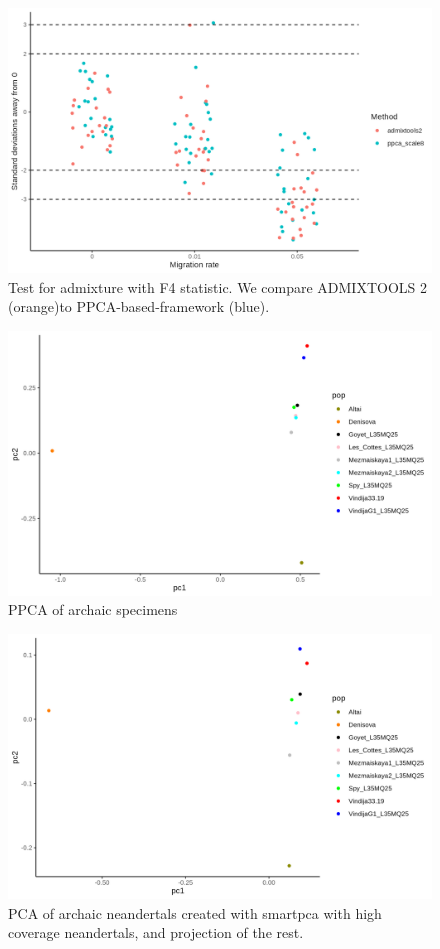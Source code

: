 \documentclass[12pt, letterpaper]{article}
\begin{document}
\begin{figure}[ht!]
    \includegraphics[width=16.5cm]{plots/simfiles/AvgFolder/Ne1000/split_times1000/npop10_nind100/missing0/plots_8/hypothesis_test_comparison.png}
    \centering
    \caption{Test for admixture with F4 statistic. We compare ADMIXTOOLS 2 (orange)to PPCA-based-framework (blue).}
    \label{figS2:pc_scale}
\end{figure}


\begin{figure}[ht!]
    \includegraphics[width=16.5cm]{plots/neandertal_pca_smartpca.png}
    \centering
    \caption{PPCA of archaic specimens}
    \label{figS2:pc_scale}
\end{figure}

\begin{figure}[ht!]
    \includegraphics[width=16.5cm]{plots/neandertal_ppca.png}
    \centering
    \caption{PCA of archaic neandertals created with smartpca with high coverage neandertals, and projection of the rest.}
    \label{figS2:pc_scale}
\end{figure}
\end{document}
